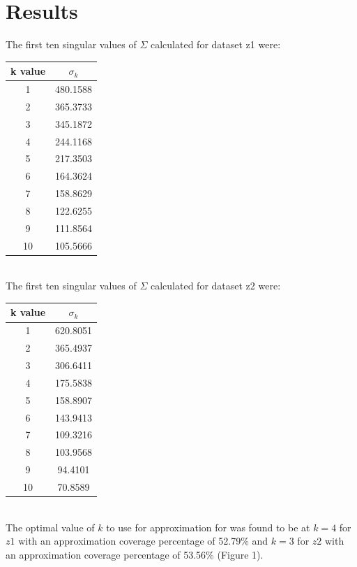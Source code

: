 \documentclass{article}
\begin{document}
	\section*{Results}
	The first ten singular values of $\Sigma$ calculated for dataset z1 were:
	\begin{table}[ht]
		\centering
		\begin{tabular}{ c | c }
			\hline
			\hline	
			k value & $\sigma _k$ \\
			\hline
			1 & 480.1588 \\
			2 & 365.3733 \\
			3 & 345.1872 \\
			4 & 244.1168 \\
			5 & 217.3503 \\
			6 & 164.3624 \\
			7 & 158.8629 \\
			8 & 122.6255 \\
			9 & 111.8564 \\
			10 & 105.5666 \\
			\hline
		\end{tabular}
	\end{table}
	\\The first ten singular values of $\Sigma$ calculated for dataset z2 were:
	\begin{table}[ht]
		\centering
		\begin{tabular}{ c | c }
			\hline
			\hline	
			k value & $\sigma _k$ \\
			\hline
			1 & 620.8051 \\
			2 & 365.4937 \\
			3 & 306.6411 \\
			4 & 175.5838 \\
			5 & 158.8907 \\
			6 & 143.9413 \\
			7 & 109.3216 \\
			8 & 103.9568 \\
			9 & 94.4101 \\
			10 & 70.8589 \\
			\hline
		\end{tabular}
	\end{table}
	\\The optimal value of $k$ to use for approximation for was found to be at $k = 4$ for $z1$ with an approximation coverage percentage of 52.79\% and $k = 3$ for $z2$ with an approximation coverage percentage of 53.56\% (Figure 1).
\end{document}

